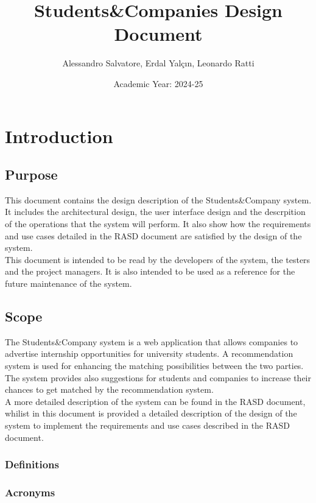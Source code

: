 \documentclass[a4paper,12pt]{article}
\begin{document}
\title{Students\&Companies Design Document} %
\author{Alessandro Salvatore, Erdal Yalçın, Leonardo Ratti}
\date{Academic Year: 2024-25}
\maketitle


\newpage
\tableofcontents
\section{Introduction}
\subsection{Purpose}
This document contains the design description of the Students\&Company system. It includes
the architectural design, the user interface design and the descrpition of the operations
that the system will perform. It also show how the requirements and use cases detailed
in the RASD document are satisfied by the design of the system. \\ \newline 
This document is intended to be read by the developers of the system, the testers and the
project managers. It is also intended to be used as a reference for the future maintenance
of the system.
\subsection{Scope}
The Students\&Company system is a web application that allows companies to advertise internship opportunities
for university students. A recommendation system is used for enhancing the matching possibilities between the two parties.
The system provides also suggestions for students and companies to increase their chances to get matched by the recommendation system. \\ \newline
A more detailed description of the system can be found in the RASD document, whilist in
this document is provided a detailed description of the design of the system to implement
the requirements and use cases described in the RASD document.
\subsubsection{Definitions}
\subsubsection{Acronyms}
\end{document}
